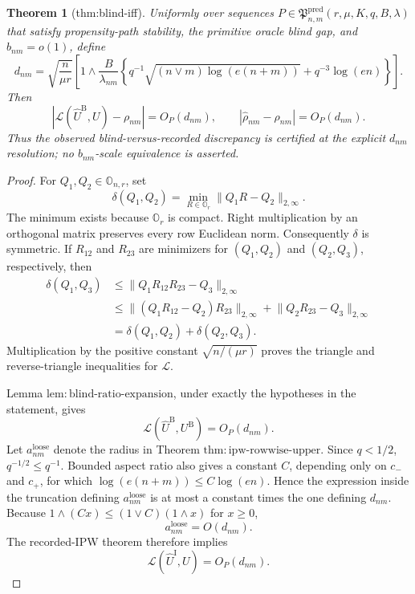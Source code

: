 \documentclass{article}
\newtheorem{theorem}{Theorem}
\begin{document}
\begin{theorem}[thm:blind-iff]\label{thm:blind-iff}
Uniformly over sequences \(P\in\mathfrak P^{\mathrm{pred}}_{n,m}(r,\mu,K,q,B,\lambda)\) that satisfy propensity-path stability, the primitive oracle blind gap, and \(b_{nm}=o(1)\), define
\[
 d_{nm}=\sqrt{\frac n{\mu r}}\left[1\wedge
 \frac B{\lambda_{nm}}\left\{
 q^{-1}\sqrt{(n\vee m)\log(e(n+m))}+q^{-3}\log(en)
 \right\}\right].
\]
Then
\[
 \left|\mathcal L(\widehat U^{\mathrm B},U)-\rho_{nm}\right|=O_P(d_{nm}),
 \qquad
 |\widehat\rho_{nm}-\rho_{nm}|=O_P(d_{nm}).
\]
Thus the observed blind-versus-recorded discrepancy is certified at the explicit \(d_{nm}\) resolution; no \(b_{nm}\)-scale equivalence is asserted.
\end{theorem}
\begin{proof}
For \(Q_1,Q_2\in\mathbb O_{n,r}\), set
\[
 \delta(Q_1,Q_2)=\min_{R\in\mathbb O_r}
 \lVert Q_1R-Q_2\rVert_{2,\infty}.
\]
The minimum exists because \(\mathbb O_r\) is compact.  Right multiplication by an orthogonal matrix preserves every row Euclidean norm.  Consequently \(\delta\) is symmetric.  If \(R_{12}\) and \(R_{23}\) are minimizers for \((Q_1,Q_2)\) and \((Q_2,Q_3)\), respectively, then
\[
 \begin{aligned}
 \delta(Q_1,Q_3)
 &\le\lVert Q_1R_{12}R_{23}-Q_3\rVert_{2,\infty}\\
 &\le\lVert(Q_1R_{12}-Q_2)R_{23}\rVert_{2,\infty}
 +\lVert Q_2R_{23}-Q_3\rVert_{2,\infty}\\
 &=\delta(Q_1,Q_2)+\delta(Q_2,Q_3).
 \end{aligned}
\]
Multiplication by the positive constant \(\sqrt{n/(\mu r)}\) proves the triangle and reverse-triangle inequalities for \(\mathcal L\).

Lemma \(\mathrm{lem:blind\mbox{-}ratio\mbox{-}expansion}\), under exactly the hypotheses in the statement, gives
\[
 \mathcal L(\widehat U^{\mathrm B},U^{\mathrm B})=O_P(d_{nm}).
\]
Let \(a^{\mathrm{loose}}_{nm}\) denote the radius in Theorem \(\mathrm{thm:ipw\mbox{-}rowwise\mbox{-}upper}\).  Since \(q<1/2\),
\(q^{-1/2}\le q^{-1}\).  Bounded aspect ratio also gives a constant \(C\), depending only on \(c_-\) and \(c_+\), for which
\(\log(e(n+m))\le C\log(en)\).  Hence the expression inside the truncation defining \(a^{\mathrm{loose}}_{nm}\) is at most a constant times the one defining \(d_{nm}\).  Because
\(1\wedge(Cx)\le(1\vee C)(1\wedge x)\) for \(x\ge0\),
\[
 a^{\mathrm{loose}}_{nm}=O(d_{nm}).
\]
The recorded-IPW theorem therefore implies
\[
 \mathcal L(\widehat U^{\mathrm I},U)=O_P(d_{nm}).
\]


\end{proof}
\end{document}
